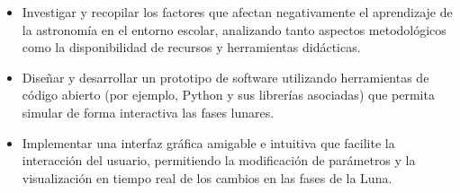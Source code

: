 \begin{itemize}
    \item Investigar y recopilar los factores que afectan negativamente el aprendizaje de la astronomía en el entorno escolar, analizando tanto aspectos metodológicos como la disponibilidad de recursos y herramientas didácticas.
    \item Diseñar y desarrollar un prototipo de software utilizando herramientas de código abierto (por ejemplo, Python y sus librerías asociadas) que permita simular de forma interactiva las fases lunares.
    \item Implementar una interfaz gráfica amigable e intuitiva que facilite la interacción del usuario, permitiendo la modificación de parámetros y la visualización en tiempo real de los cambios en las fases de la Luna.
\end{itemize}

